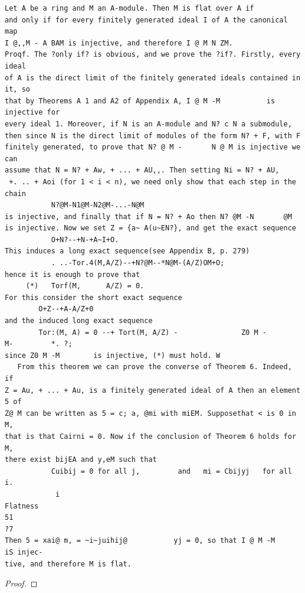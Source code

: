 \begin{theorem}\label{mcrt-auto-theorem-7-7}\uses{}
\begin{verbatim}
Let A be a ring and M an A-module. Then M is flat over A if
and only if for every finitely generated ideal I of A the canonical map
I @,,M - A BAM is injective, and therefore I @ M N ZM.
Proqf. The ?only if? is obvious, and we prove the ?if?. Firstly, every ideal
of A is the direct limit of the finitely generated ideals contained in it, so
that by Theorems A 1 and A2 of Appendix A, I @ M -M           is injective for
every ideal 1. Moreover, if N is an A-module and N? c N a submodule,
then since N is the direct limit of modules of the form N? + F, with F
finitely generated, to prove that N? @ M -       N @ M is injective we can
assume that N = N? + Aw, + ... + AU,,. Then setting Ni = N? + AU,
 +. .. + Aoi (for 1 < i < n), we need only show that each step in the
chain
           N?@M-N1@M-N2@M-...-N@M
is injective, and finally that if N = N? + Ao then N? @M -N       @M
is injective. Now we set Z = {a~ A(u~EN?}, and get the exact sequence
           O+N?--+N-+A~I+O.
This induces a long exact sequence(see Appendix B, p. 279)
           . ..-Tor.4(M,A/Z)--+N?@M--*N@M-(A/Z)OM+O;
hence it is enough to prove that
     (*)   Torf(M,      A/Z) = 0.
For this consider the short exact sequence
        O+Z--+A-A/Z+0
and the induced long exact sequence
        Tor:(M, A) = 0 --+ Tort(M, A/Z) -               Z0 M -       M-         *. ?;
since Z0 M -M        is injective, (*) must hold. W
   From this theorem we can prove the converse of Theorem 6. Indeed, if
Z = Au, + ... + Au, is a finitely generated ideal of A then an element 5 of
Z@ M can be written as 5 = c; a, @mi with miEM. Supposethat < is 0 in M,
that is that Cairni = 0. Now if the conclusion of Theorem 6 holds for M,
there exist bijEA and y,eM such that
           Cuibij = 0 for all j,         and   mi = Cbijyj   for all      i.
            i
Flatness                                                              51
?7
Then 5 = xai@ m, = ~i~juihij@           yj = 0, so that I @ M -M        iS injec-
tive, and therefore M is flat.
\end{verbatim}
\end{theorem}
\begin{proof}
\notready
\end{proof}


